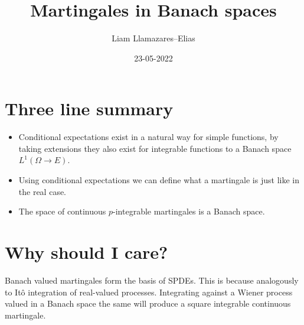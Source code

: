 \documentclass[
    a4paper,
    DIV=14,
    abstract=true,
    numbers=noenddot
]{scrartcl}
\begin{document}
\title{Martingales in Banach spaces}
\author{Liam Llamazares--Elias}
\date{23-05-2022}
\maketitle
\section{Three line summary}
\begin{itemize}
	\item Conditional expectations exist in a natural way for simple functions, by taking extensions they also exist for integrable functions to a Banach space $L^1(\Omega\to E)$.
	\item Using conditional expectations we can define what a martingale is just like in the real case.
	\item The space of continuous $p$-integrable martingales is a Banach space.
\end{itemize}
\section{Why should I care?}
Banach valued martingales form the basis of SPDEs. This is because analogously to Itô integration of real-valued processes. Integrating against a Wiener process valued in a Banach space the same will produce a square integrable continuous martingale.
\end{document}

